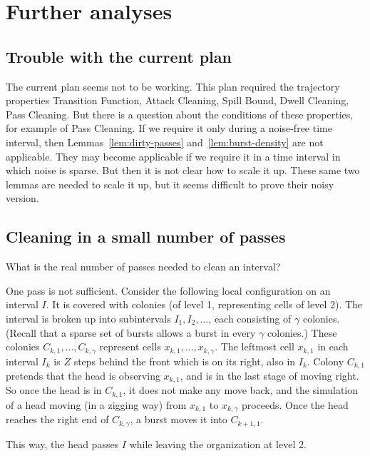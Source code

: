 \documentclass[12pt]{memoir}
\newcommand{\Z}{Z}
\begin{document}
\section{Further analyses}

\subsection{Trouble with the current plan}

The current plan seems not to be working. 
This plan required the trajectory properties
Transition Function, Attack Cleaning, Spill Bound, Dwell Cleaning, Pass Cleaning.
But there is a question about the conditions of these properties, for example
of Pass Cleaning.
If we require it only during a noise-free time interval, then Lemmas~\ref{lem:dirty-passes} 
and~\ref{lem:burst-density} are not applicable.
They may become applicable if we require it in a time interval in which noise is sparse.
But then it is not clear how to scale it up.
These same two lemmas are needed to scale it up, but it seems difficult to prove their
noisy version.

\subsection{Cleaning in a small number of passes}

What is the real number of passes needed to clean an interval?

\begin{example}
  One pass is not sufficient.
Consider the following local configuration on an interval \( I \).
It is covered with colonies (of level 1, representing cells of level 2).
The interval is broken up into subintervals \( I_{1},I_{2},\dots \), each consisting of \( \gamma \) colonies.
(Recall that a sparse set of bursts allows a burst in every \( \gamma \) colonies.)
These colonies \( C_{k,1},\dots,C_{k,\gamma} \) represent cells \( x_{k,1},\dots, x_{k,\gamma} \).
The leftmost cell \( x_{k,1} \) in each interval \( I_{k} \) is 
\( \Z \) steps behind the front which is on its right, also in \( I_{k} \).
Colony \( C_{k,1} \) 
pretends that the head is observing \( x_{k,1} \), and is in the last stage of moving right.
So once the head is in \( C_{k,1} \), it does not make any move back, and
the simulation of a head moving (in a zigging way) from \( x_{k,1} \) to \( x_{k,\gamma} \) proceeds.
Once the head reaches the right end of \( C_{k,\gamma} \), a burst moves it
into \( C_{k+1,1} \).

This way, the head passes \( I \) while leaving the organization at level 2.
\end{example}
\end{document}
